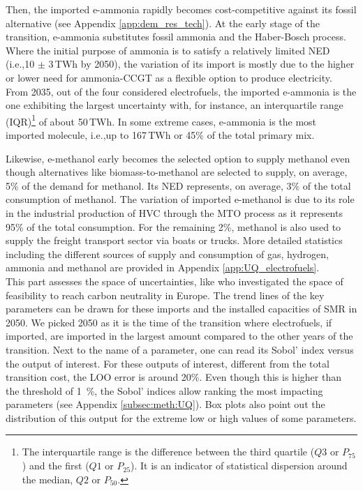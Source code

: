 \documentclass[11pt,twoside,a4paper,english]{article}
\def\ie{i.e.,}
\begin{document}
Then, the imported e-ammonia rapidly becomes cost-competitive against its fossil alternative (see Appendix \ref{app:dem_res_tech}). At the early stage of the transition, e-ammonia substitutes fossil ammonia and the Haber-Bosch process. Where the initial purpose of ammonia is to satisfy a relatively limited \acrfull{NED} (\ie 10 $\pm$ 3\,TWh by 2050), the variation of its import is mostly due to the higher or lower need for ammonia-\gls{CCGT} as a flexible option to produce electricity. From 2035, out of the four considered electrofuels, the imported e-ammonia is the one exhibiting the largest uncertainty with, for instance, an interquartile range (IQR)\footnote{The interquartile range is the difference between the third quartile ($Q3$ or $P_{75}$) and the first ($Q1$ or $P_{25}$). It is an indicator of statistical dispersion around the median, $Q2$ or $P_{50}$.} of about 50\,TWh. In some extreme cases, e-ammonia is the most imported molecule, \ie up to 167\,TWh or 45\% of the total primary mix. 

Likewise, e-methanol early becomes the selected option to supply methanol even though alternatives like biomass-to-methanol are selected to supply, on average, 5\% of the demand for methanol. Its \gls{NED} represents, on average, 3\% of the total consumption of methanol. The variation of imported e-methanol is due to its role in the industrial production of \gls{HVC} through the \acrfull{MTO} process as it represents 95\% of the total consumption. For the remaining 2\%, methanol is also used to supply the freight transport sector via boats or trucks. More detailed statistics including the different sources of supply and consumption of gas, hydrogen, ammonia and methanol are provided in Appendix \ref{app:UQ_electrofuels}.\\

This part assesses the space of uncertainties, like \citet{pickering2022diversity} who investigated the space of feasibility to reach carbon neutrality in Europe. The trend lines of the key parameters can be drawn for these imports and the installed capacities of \gls{SMR} in 2050. We picked 2050 as it is the time of the transition where electrofuels, if imported, are imported in the largest amount compared to the other years of the transition. Next to the name of a parameter, one can read its Sobol' index versus the output of interest. For these outputs of interest, different from the total transition cost, the \gls{LOO} error is around 20\%. Even though this is higher than the threshold of \SI{1}{\%}, the Sobol' indices allow ranking the most impacting parameters (see Appendix \ref{subsec:meth:UQ}). Box plots also point out the distribution of this output for the extreme low or high values of some parameters.
\end{document}
